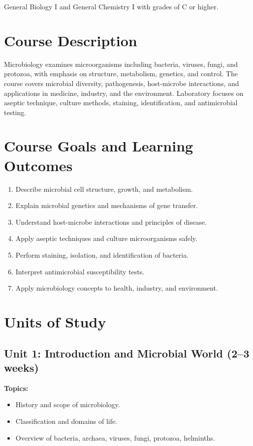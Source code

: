 \documentclass[12pt,oneside]{book}
\begin{document}
General Biology I and General Chemistry I with grades of C or higher.

\section{Course Description}

Microbiology examines microorganisms including bacteria, viruses, fungi, and protozoa, with emphasis on structure, metabolism, genetics, and control. The course covers microbial diversity, pathogenesis, host-microbe interactions, and applications in medicine, industry, and the environment. Laboratory focuses on aseptic technique, culture methods, staining, identification, and antimicrobial testing.

\section{Course Goals and Learning Outcomes}

\begin{enumerate}
    \item Describe microbial cell structure, growth, and metabolism.
    \item Explain microbial genetics and mechanisms of gene transfer.
    \item Understand host-microbe interactions and principles of disease.
    \item Apply aseptic techniques and culture microorganisms safely.
    \item Perform staining, isolation, and identification of bacteria.
    \item Interpret antimicrobial susceptibility tests.
    \item Apply microbiology concepts to health, industry, and environment.
\end{enumerate}

\section{Units of Study}

\subsection{Unit 1: Introduction and Microbial World (2--3 weeks)}

\textbf{Topics:}
\begin{itemize}
    \item History and scope of microbiology.
    \item Classification and domains of life.
    \item Overview of bacteria, archaea, viruses, fungi, protozoa, helminths.
\end{itemize}
\end{document}
